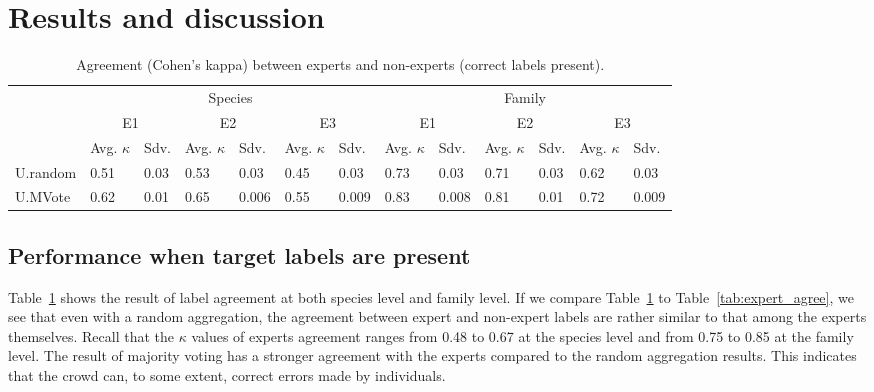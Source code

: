 \section{Results and discussion}
\label{sec:res}
%
\begin{table}[t!]
\centering
\begin{tabular}{@{}l@{~~}l@{~~}l@{~~~}l@{~~}l@{~~~}l@{~~}l@{~~~}l@{~~}l@{~~~}l@{~~}l@{~~~}l@{~}l@{}}
\hline
& \multicolumn{6}{c}{Species} & \multicolumn{6}{c}{Family} \\
& \multicolumn{2}{c}{E1} & \multicolumn{2}{c}{E2} & \multicolumn{2}{c}{E3} & \multicolumn{2}{c}{E1} & \multicolumn{2}{c}{E2} & \multicolumn{2}{c}{E3} \\
& Avg. $\kappa$ & Sdv. & Avg. $\kappa$ & Sdv. & Avg. $\kappa$ & Sdv. & Avg. $\kappa$ & Sdv. & Avg. $\kappa$ & Sdv. & Avg. $\kappa$ & Sdv.\\
\hline
U.random & 0.51 & 0.03 & 0.53 & 0.03 & 0.45 & 0.03     & 0.73 & 0.03 & 0.71 & 0.03 & 0.62 & 0.03\\ 
U.MVote & 0.62 & 0.01 & 0.65 & 0.006 & 0.55 & 0.009   & 0.83 & 0.008 & 0.81 & 0.01 & 0.72 & 0.009\\
\hline
\end{tabular}
\caption{Agreement (Cohen's kappa) between experts and non-experts  (correct labels present).}
\label{tab:agree1}
\end{table}

\subsection{Performance when target labels are present}

Table~\ref{tab:agree1} shows the result of label agreement
at both species level and family level. 
If we compare Table~\ref{tab:agree1} to Table~\ref{tab:expert_agree}, we see that 
even with a random aggregation, the agreement between expert and non-expert 
labels are rather similar to that among the experts themselves.
Recall that the $\kappa$ values of experts agreement ranges from 0.48 to 0.67 at
the species level and from 0.75 to 0.85 at the family level. 
%
The result of majority voting has a stronger agreement with the experts compared
to the random aggregation results. This indicates that the crowd can, to some extent, correct
errors made by individuals. 

